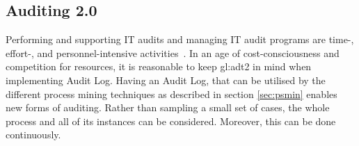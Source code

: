








\subsection{Auditing 2.0}\label{sec:adt2sa}

Performing and supporting IT audits and managing IT audit programs are time-, effort-, and personnel-intensive activities~\citep{GANTZ20141-T}. In an age of cost-consciousness and competition for resources, it is reasonable to keep \gls{gl:adt2} in mind when implementing Audit Log. Having an Audit Log, that can be utilised by the different process mining techniques as described in section \ref{sec:psmin} enables new forms of auditing. Rather than sampling a small set of cases, the whole process and all of its instances can be considered. Moreover, this can be done continuously.


